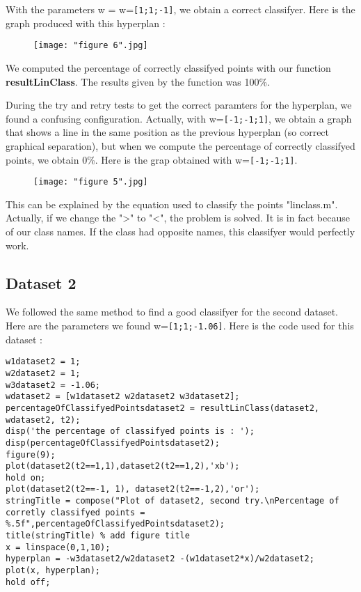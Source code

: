 \documentclass[a4paper]{article}
\begin{document}
	\pagebreak
	With the parameters w =  w=\verb![1;1;-1]!, we obtain a correct classifyer. 
	Here is the graph produced with this hyperplan :
	
	
	\begin{center}
		\begin{figure}[h]
			\begin{center}
				\texttt{[image: "figure 6".jpg]}
			\end{center}
		\end{figure}
	\end{center}

	We computed the percentage of correctly classifyed points with our function \textbf{resultLinClass}. The results given by the function was 100\%.
	
	During the try and retry tests to get the correct paramters for the hyperplan, we found a confusing configuration. Actually, with w=\verb![-1;-1;1]!, we obtain a graph that shows a line in the same position as the previous hyperplan (so correct graphical separation), but when we compute the percentage of correctly classifyed points, we obtain 0\%. Here is the grap obtained with w=\verb![-1;-1;1]!.
	
	\begin{center}
		\begin{figure}[h]
			\begin{center}
				\texttt{[image: "figure 5".jpg]}
			\end{center}
		\end{figure}
	\end{center}
	This can be explained by the equation used to classify the points "linclass.m". Actually, if we change the ">" to "<", the problem is solved. It is in fact because of our class names. If the class had opposite names, this classifyer would perfectly work.
	
	\pagebreak
	
	\subsection{Dataset 2}
	We followed the same method to find a good classifyer for the second dataset. Here are the parameters we found w=\verb|[1;1;-1.06]|.
	Here is the code used for this dataset :
	
\begin{lstlisting}[frame=single]
w1dataset2 = 1;
w2dataset2 = 1;
w3dataset2 = -1.06;
wdataset2 = [w1dataset2 w2dataset2 w3dataset2];
percentageOfClassifyedPointsdataset2 = resultLinClass(dataset2, wdataset2, t2);
disp('the percentage of classifyed points is : ');
disp(percentageOfClassifyedPointsdataset2);
figure(9);
plot(dataset2(t2==1,1),dataset2(t2==1,2),'xb');
hold on;
plot(dataset2(t2==-1, 1), dataset2(t2==-1,2),'or');
stringTitle = compose("Plot of dataset2, second try.\nPercentage of corretly classifyed points = %.5f",percentageOfClassifyedPointsdataset2);
title(stringTitle) % add figure title
x = linspace(0,1,10);
hyperplan = -w3dataset2/w2dataset2 -(w1dataset2*x)/w2dataset2;
plot(x, hyperplan);
hold off;
\end{lstlisting}
	
\end{document}
